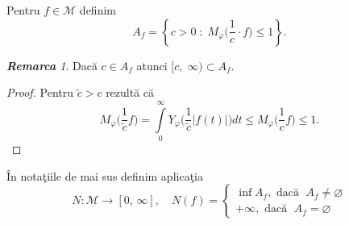 \documentclass[ a4paper, 12pt]{report}
\theoremstyle{definition}
\theoremstyle{remark}
\newtheorem{remarc}{\bf Remarca}[section]
\numberwithin{equation}{section}
\begin{document}
Pentru $f \in \mathcal{M}$ definim
$$A_f = \left\{ c>0 \; : \; M_\varphi \Big( \frac{1}{c} \cdot f\Big) \leq 1\right\}.$$

\begin{remarc}
Dac\u a $c \in A_f$ atunci $[c,\; \infty) \subset A_f$.
\end{remarc}

\begin{proof}
Pentru $\tilde{c} > c$ rezult\u a c\u a
 $$M_\varphi \Big(\frac{1}{\tilde{c}}f\Big) = \int\limits_{0}^{\infty}Y_\varphi \Big(\frac{1}{\tilde{c}} \lvert f(t) \rvert\Big) dt \leq M_\varphi \Big(\frac{1}{c} f\Big)\leq 1.$$
\end{proof}

\medskip

\^ In nota\c tiile de mai sus definim aplica\c tia
$$N : \mathcal{M} \rightarrow [0,\, \infty], \quad N(f) = \begin{cases}
\inf A_f, \text{ dac\u a } \; A_f \neq \varnothing\\
+\infty, \text{ dac\u a } \; A_f = \varnothing
\end{cases}$$
\end{document}
